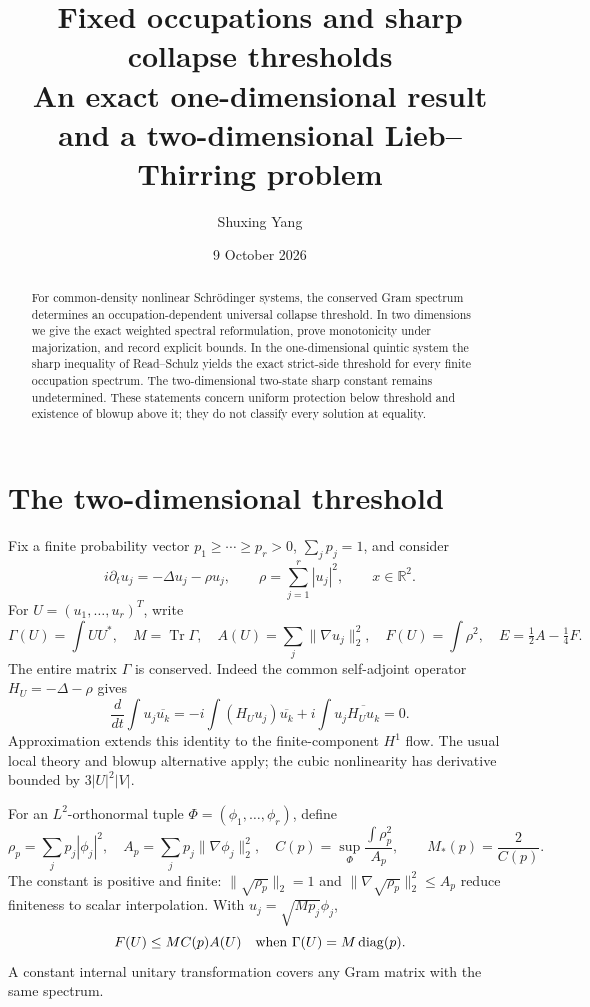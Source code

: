 \documentclass[11pt,a4paper]{article}
\title{Fixed occupations and sharp collapse thresholds\\\large An exact one-dimensional result and a two-dimensional Lieb--Thirring problem}
\author{Shuxing Yang}
\date{9 October 2026}
\newcommand{\R}{\mathbb R}
\DeclareMathOperator{\Tr}{Tr}
\begin{document}
\maketitle
\begin{abstract}
For common-density nonlinear Schr\"odinger systems, the conserved Gram spectrum determines an occupation-dependent universal collapse threshold. In two dimensions we give the exact weighted spectral reformulation, prove monotonicity under majorization, and record explicit bounds. In the one-dimensional quintic system the sharp inequality of Read--Schulz yields the exact strict-side threshold for every finite occupation spectrum. The two-dimensional two-state sharp constant remains undetermined. These statements concern uniform protection below threshold and existence of blowup above it; they do not classify every solution at equality.
\end{abstract}

\section{The two-dimensional threshold}
Fix a finite probability vector $p_1\ge\cdots\ge p_r>0$, $\sum_jp_j=1$, and consider
\begin{equation}\label{eq:model}
 i\partial_tu_j=-\Delta u_j-\rho u_j,\qquad
 \rho=\sum_{j=1}^r|u_j|^2,\qquad x\in\R^2.
\end{equation}
For $U=(u_1,\ldots,u_r)^T$, write
\[
 \Gamma(U)=\int UU^*,\quad M=\Tr\Gamma,\quad
 A(U)=\sum_j\|\nabla u_j\|_2^2,\quad F(U)=\int\rho^2,\quad E=\tfrac12A-\tfrac14F.
\]
The entire matrix $\Gamma$ is conserved. Indeed the common self-adjoint operator $H_U=-\Delta-\rho$ gives
\[
 \frac{d}{dt}\int u_j\overline{u_k}
 =-i\int(H_Uu_j)\overline{u_k}+i\int u_j\overline{H_Uu_k}=0.
\]
Approximation extends this identity to the finite-component $H^1$ flow. The usual local theory and blowup alternative apply; the cubic nonlinearity has derivative bounded by $3|U|^2|V|$.

For an $L^2$-orthonormal tuple $\Phi=(\phi_1,\ldots,\phi_r)$, define
\[
 \rho_p=\sum_jp_j|\phi_j|^2,\quad A_p=\sum_jp_j\|\nabla\phi_j\|_2^2,\quad
 C(p)=\sup_\Phi\frac{\int\rho_p^2}{A_p},\qquad M_*(p)=\frac2{C(p)}.
\]
The constant is positive and finite: $\|\sqrt{\rho_p}\|_2=1$ and $\|\nabla\sqrt{\rho_p}\|_2^2\le A_p$ reduce finiteness to scalar interpolation. With $u_j=\sqrt{Mp_j}\phi_j$,
\begin{equation}\label{eq:sharp}
 F(U)\le MC(p)A(U)\quad\hbox{when }\Gamma(U)=M\operatorname{diag}(p).
\end{equation}
A constant internal unitary transformation covers any Gram matrix with the same spectrum.
\end{document}
